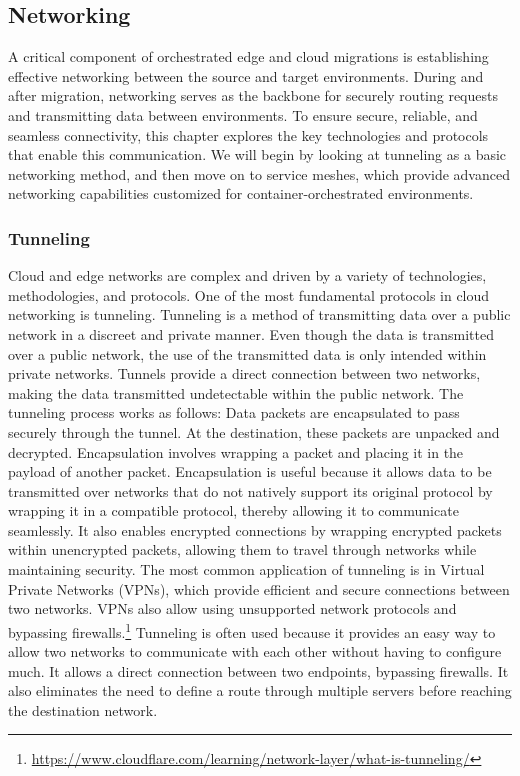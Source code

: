%
\subsection{Networking}
%
A critical component of orchestrated edge and cloud migrations is establishing effective networking between the source and target environments. During and after migration, networking serves as the backbone for securely routing requests and transmitting data between environments. To ensure secure, reliable, and seamless connectivity, this chapter explores the key technologies and protocols that enable this communication. We will begin by looking at tunneling as a basic networking method, and then move on to service meshes, which provide advanced networking capabilities customized for container-orchestrated environments.
%
\subsubsection{Tunneling}
%
Cloud and edge networks are complex and driven by a variety of technologies, methodologies, and protocols. One of the most fundamental protocols in cloud networking is tunneling. 
%
Tunneling is a method of transmitting data over a public network in a discreet and private manner. Even though the data is transmitted over a public network, the use of the transmitted data is only intended within private networks. Tunnels provide a direct connection between two networks, making the data transmitted undetectable within the public network.
%
The tunneling process works as follows: Data packets are encapsulated to pass securely through the tunnel. At the destination, these packets are unpacked and decrypted. Encapsulation involves wrapping a packet and placing it in the payload of another packet. Encapsulation is useful because it allows data to be transmitted over networks that do not natively support its original protocol by wrapping it in a compatible protocol, thereby allowing it to communicate seamlessly. It also enables encrypted connections by wrapping encrypted packets within unencrypted packets, allowing them to travel through networks while maintaining security. The most common application of tunneling is in Virtual Private Networks (VPNs), which provide efficient and secure connections between two networks. VPNs also allow using unsupported network protocols and bypassing firewalls.\footnote{\url{https://www.cloudflare.com/learning/network-layer/what-is-tunneling/}}
%
Tunneling is often used because it provides an easy way to allow two networks to communicate with each other without having to configure much. It allows a direct connection between two endpoints, bypassing firewalls. It also eliminates the need to define a route through multiple servers before reaching the destination network.

